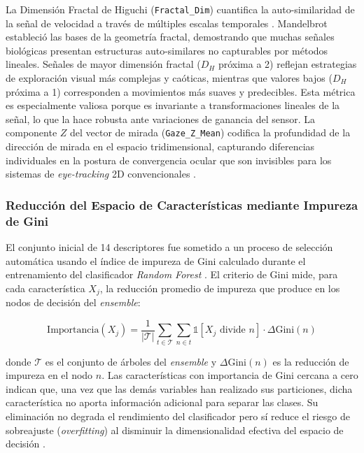 La Dimensión Fractal de Higuchi (\texttt{Fractal\_Dim}) cuantifica la auto-similaridad de la señal de velocidad a través de múltiples escalas temporales \cite{higuchi1988}. Mandelbrot \cite{mandelbrot1982fractal} estableció las bases de la geometría fractal, demostrando que muchas señales biológicas presentan estructuras auto-similares no capturables por métodos lineales. Señales de mayor dimensión fractal ($D_H$ próxima a 2) reflejan estrategias de exploración visual más complejas y caóticas, mientras que valores bajos ($D_H$ próxima a 1) corresponden a movimientos más suaves y predecibles. Esta métrica es especialmente valiosa porque es invariante a transformaciones lineales de la señal, lo que la hace robusta ante variaciones de ganancia del sensor. La componente $Z$ del vector de mirada (\texttt{Gaze\_Z\_Mean}) codifica la profundidad de la dirección de mirada en el espacio tridimensional, capturando diferencias individuales en la postura de convergencia ocular que son invisibles para los sistemas de \textit{eye-tracking} 2D convencionales \cite{duchowski2017}.

\subsubsection*{Reducción del Espacio de Características mediante Impureza de Gini}

El conjunto inicial de 14 descriptores fue sometido a un proceso de selección automática usando el índice de impureza de Gini calculado durante el entrenamiento del clasificador \textit{Random Forest} \cite{breiman2001}. El criterio de Gini mide, para cada característica $X_j$, la reducción promedio de impureza que produce en los nodos de decisión del \textit{ensemble}:

\begin{equation}
	\text{Importancia}(X_j) = \frac{1}{|\mathcal{T}|} \sum_{t \in \mathcal{T}} \sum_{n \in t} \mathbb{1}[X_j \text{ divide } n] \cdot \Delta\text{Gini}(n)
	\label{eq:gini_importance}
\end{equation}

donde $\mathcal{T}$ es el conjunto de árboles del \textit{ensemble} y $\Delta\text{Gini}(n)$ es la reducción de impureza en el nodo $n$. Las características con importancia de Gini cercana a cero indican que, una vez que las demás variables han realizado sus particiones, dicha característica no aporta información adicional para separar las clases. Su eliminación no degrada el rendimiento del clasificador pero sí reduce el riesgo de sobreajuste (\textit{overfitting}) al disminuir la dimensionalidad efectiva del espacio de decisión \cite{breiman2001}.

